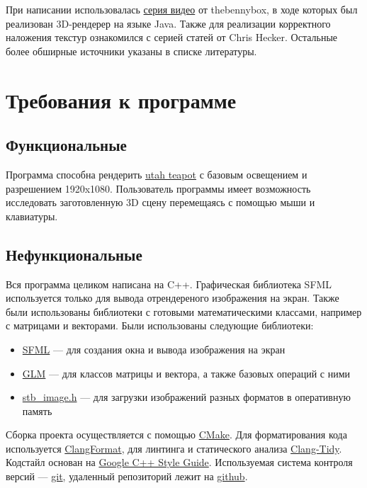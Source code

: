 \documentclass{article}
\begin{document}
При написании использовалась \href{https://www.youtube.com/watch?v=Y_vvC2G7vRo&list=PLEETnX-uPtBUbVOok816vTl1K9vV1GgH5&index=2}{серия видео} от thebennybox, в ходе 
которых был реализован 3D-рендерер на языке Java. Также для реализации 
корректного наложения текстур ознакомился с серией статей от 
Chris Hecker\cite{Textures}. Остальные более обширные источники указаны в 
списке литературы.

\section{Требования к программе}
\subsection*{Функциональные}
    Программа способна рендерить \href{https://en.wikipedia.org/wiki/Utah_teapot}{utah teapot} с 
    базовым освещением и разрешением 1920x1080. Пользователь программы 
    имеет возможность исследовать заготовленную 3D сцену перемещаясь с помощью мыши и 
    клавиатуры.  

\subsection*{Нефункциональные}
Вся программа целиком написана на C++. Графическая библиотека SFML используется
только для вывода отрендереного изображения на экран.
Также были использованы библиотеки с готовыми математическими классами, например с матрицами 
и векторами. 
Были использованы следующие библиотеки:
\begin{itemize}
    \item \href{https://www.sfml-dev.org/index.php}{SFML} --- для создания окна и вывода изображения на экран 
    \item \href{https://github.com/g-truc/glm}{GLM} --- для классов матрицы и вектора, а также базовых 
    операций с ними
    \item \href{https://github.com/nothings/stb/blob/master/stb\_image.h}{stb\_image.h} --- для загрузки изображений разных форматов в оперативную память
\end{itemize}
Сборка проекта осуществляется с помощью \href{https://cmake.org/}{CMake}.
Для форматирования кода используется \href{https://clang.llvm.org/docs/ClangFormat.html}{ClangFormat}, 
для линтинга и статического анализа \href{https://releases.llvm.org/10.0.0/tools/clang/tools/extra/docs/clang-tidy/index.html#:~:text=clang%2Dtidy%20is%20a%20clang,be%20deduced%20via%20static%20analysis.}{Clang-Tidy}.
Кодстайл основан на \href{https://google.github.io/styleguide/cppguide.html}{Google C++ Style Guide}.
Используемая система контроля версий --- \href{https://git-scm.com/}{git}, удаленный репозиторий 
лежит на \href{github.com}{github}. 
\end{document}

